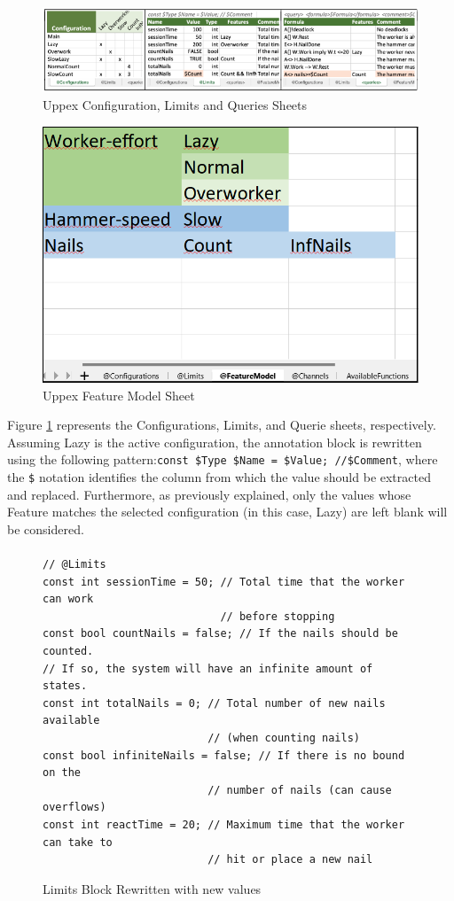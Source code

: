 \begin{figure} [H]
    \centering
    \includegraphics[width=\linewidth]{chapters/uppex.png}
    \caption{Uppex Configuration, Limits and Queries Sheets}
    \label{fig:WH_uppex}
\end{figure}

\begin{figure} [H]
    \centering
    \includegraphics[width=0.4\linewidth]{images/upe_WH.png}
    \caption{Uppex Feature Model Sheet}
    \label{fig:WH_FM}
\end{figure}

Figure \ref{fig:WH_uppex} represents the Configurations, Limits, and Querie sheets, respectively. Assuming Lazy is the active configuration, the annotation block is rewritten using the following pattern:\texttt{const \$Type \$Name = \$Value; //\$Comment}, where the \texttt{\$} notation identifies the column from which the value should be extracted and replaced. Furthermore, as previously explained, only the values whose Feature matches the selected configuration (in this case, Lazy) are left blank will be considered.
\paragraph{}


\begin{figure}[H]
\centering
\begin{minipage}{2.9\linewidth}
\begin{lstlisting}[language=MOREUPPAAL]
// @Limits
const int sessionTime = 50; // Total time that the worker can work
                            // before stopping 
const bool countNails = false; // If the nails should be counted. 
// If so, the system will have an infinite amount of states. 
const int totalNails = 0; // Total number of new nails available
                          // (when counting nails) 
const bool infiniteNails = false; // If there is no bound on the
                          // number of nails (can cause overflows) 
const int reactTime = 20; // Maximum time that the worker can take to
                          // hit or place a new nail 
\end{lstlisting}
\end{minipage}
\caption{Limits Block Rewritten with new values}
\label{fig:worker-config}
\end{figure}

